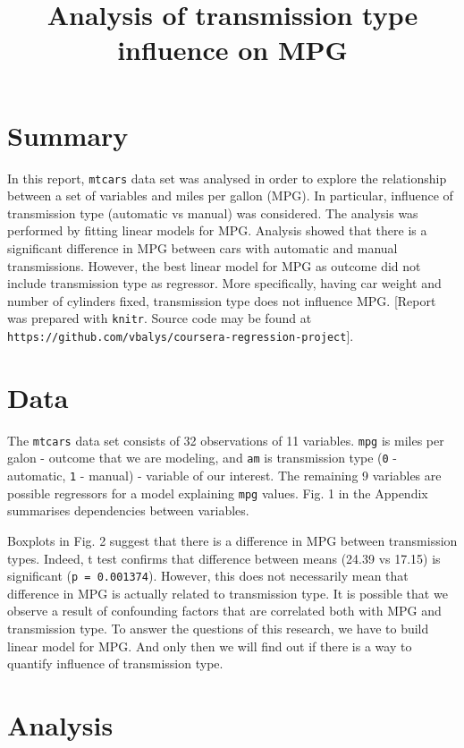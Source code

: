\documentclass[10pt,]{article}
\title{Analysis of transmission type influence on MPG}
\author{}
\date{}
\begin{document}
\maketitle


\section{Summary}\label{summary}

In this report, \texttt{mtcars} data set was analysed in order to
explore the relationship between a set of variables and miles per gallon
(MPG). In particular, influence of transmission type (automatic vs
manual) was considered. The analysis was performed by fitting linear
models for MPG. Analysis showed that there is a significant difference
in MPG between cars with automatic and manual transmissions. However,
the best linear model for MPG as outcome did not include transmission
type as regressor. More specifically, having car weight and number of
cylinders fixed, transmission type does not influence MPG. {[}Report was
prepared with \texttt{knitr}. Source code may be found at
\texttt{https://github.com/vbalys/coursera-regression-project}{]}.

\section{Data}\label{data}

The \texttt{mtcars} data set consists of 32 observations of 11
variables. \texttt{mpg} is miles per galon - outcome that we are
modeling, and \texttt{am} is transmission type (\texttt{0} - automatic,
\texttt{1} - manual) - variable of our interest. The remaining 9
variables are possible regressors for a model explaining \texttt{mpg}
values. Fig. 1 in the Appendix summarises dependencies between
variables.

Boxplots in Fig. 2 suggest that there is a difference in MPG between
transmission types. Indeed, t test confirms that difference between
means (24.39 vs 17.15) is significant (\texttt{p = 0.001374}). However,
this does not necessarily mean that difference in MPG is actually
related to transmission type. It is possible that we observe a result of
confounding factors that are correlated both with MPG and transmission
type. To answer the questions of this research, we have to build linear
model for MPG. And only then we will find out if there is a way to
quantify influence of transmission type.

\section{Analysis}\label{analysis}
\end{document}

